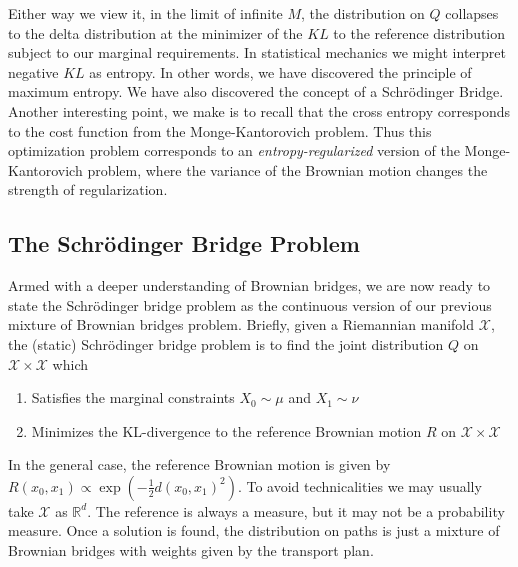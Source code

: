 \documentclass{article}
\begin{document}
Either way we view it, in the limit of infinite $M$, the
distribution on $Q$ collapses to the delta distribution at the minimizer of the
$KL$ to the reference distribution subject to our marginal requirements. In
statistical mechanics we might interpret negative $KL$ as entropy. In other
words, we have discovered the principle of maximum entropy. We have also
discovered the concept of a Schrödinger Bridge. Another interesting point,
we make is to recall that the cross entropy corresponds to the cost function
from the Monge-Kantorovich problem. Thus this optimization problem corresponds
to an \emph{entropy-regularized} version of the Monge-Kantorovich problem,
where the variance of the Brownian motion changes the strength of
regularization.

\subsection{The Schrödinger Bridge Problem}
Armed with a deeper understanding of Brownian bridges, we are now ready to
state the Schrödinger bridge problem as the continuous version of our previous
mixture of Brownian bridges problem. Briefly, given a Riemannian manifold
$\mathcal X$, the (static) Schrödinger bridge problem is to find the joint
distribution $Q$ on $\mathcal X \times \mathcal X$ which
\begin{enumerate}
    \item Satisfies the marginal constraints $X_0 \sim \mu$ and $X_1 \sim \nu$
    \item Minimizes the
KL-divergence to the reference Brownian motion $R$ on $\mathcal X \times \mathcal X$
\end{enumerate}
In the general case, the reference Brownian motion is given by
$R(x_0, x_1) \propto \exp\left(-\frac 1 2 d(x_0, x_1)^2 \right)$. To avoid 
technicalities we may usually take $\mathcal X$ as $\mathbb R^d$. The reference
is always a measure, but it may not be a probability measure. Once
a solution is found, the distribution on paths is just a mixture of
Brownian bridges with weights given by the transport plan.
\end{document}
